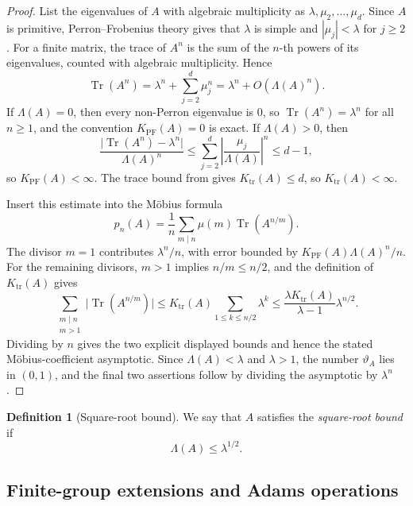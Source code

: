 \documentclass[11pt,a4paper]{amsart}
\theoremstyle{plain}
\theoremstyle{definition}
\newtheorem{definition}[theorem]{Definition}
\theoremstyle{remark}
\DeclareMathOperator{\Tr}{Tr}
\newcommand{\abs}[1]{\lvert #1 \rvert}
\begin{document}
\begin{proof}
  List the eigenvalues of \(A\) with algebraic multiplicity as
  \(\lambda,\mu_2,\dots,\mu_d\). Since \(A\) is primitive,
  Perron--Frobenius theory \cite{Seneta2006NonnegativeMatrices} gives that
  \(\lambda\) is simple and
  \(|\mu_j|<\lambda\) for \(j\ge 2\). For a finite matrix,
  the trace of \(A^n\) is the sum of the \(n\)-th powers of its
  eigenvalues, counted with algebraic multiplicity. Hence
  \[
    \Tr(A^n)
    =
    \lambda^n+\sum_{j=2}^d\mu_j^n
    =
    \lambda^n+O(\Lambda(A)^n).
  \]
  If \(\Lambda(A)=0\), then every non-Perron eigenvalue is \(0\), so
  \(\Tr(A^n)=\lambda^n\) for all \(n\ge 1\), and the convention
  \(K_{\mathrm{PF}}(A)=0\) is exact. If \(\Lambda(A)>0\), then
  \[
    \frac{\abs{\Tr(A^n)-\lambda^n}}{\Lambda(A)^n}
    \le
    \sum_{j=2}^d\left|\frac{\mu_j}{\Lambda(A)}\right|^n
    \le d-1,
  \]
  so \(K_{\mathrm{PF}}(A)<\infty\). The trace bound from
   gives \(K_{\mathrm{tr}}(A)\le d\), so
  \(K_{\mathrm{tr}}(A)<\infty\).

  Insert this estimate into the M\"obius formula
  \[
    p_n(A)=\frac{1}{n}\sum_{m\mid n}\mu(m)\Tr(A^{n/m}).
  \]
  The divisor \(m=1\) contributes \(\lambda^n/n\), with error bounded
  by \(K_{\mathrm{PF}}(A)\Lambda(A)^n/n\). For the remaining divisors,
  \(m>1\) implies \(n/m\le n/2\), and the definition of
  \(K_{\mathrm{tr}}(A)\) gives
  \[
    \sum_{\substack{m\mid n\\ m>1}}\abs{\Tr(A^{n/m})}
    \le
    K_{\mathrm{tr}}(A)\sum_{1\le k\le n/2}\lambda^k
    \le
    \frac{\lambda K_{\mathrm{tr}}(A)}{\lambda-1}\lambda^{n/2}.
  \]
  Dividing by \(n\) gives the two explicit displayed bounds and hence
  the stated M\"obius-coefficient asymptotic.
  Since \(\Lambda(A)<\lambda\) and \(\lambda>1\), the number
  \(\vartheta_A\) lies in \((0,1)\), and the final two assertions follow
  by dividing the asymptotic by \(\lambda^n\).
\end{proof}

\begin{definition}[Square-root bound]\label{def:kernel-rh}
We say that \(A\) satisfies the \emph{square-root bound} if
\[
  \Lambda(A)\le \lambda^{1/2}.
\]
\end{definition}

\subsection{Finite-group extensions and Adams operations}
\end{document}
